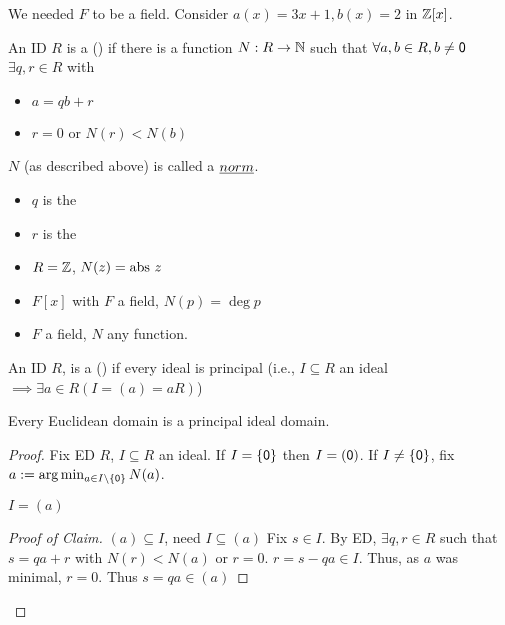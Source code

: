 \documentclass[notes.tex]{subfiles}
\begin{document}
We needed $F$ to be a field. Consider $a(x) = 3x+1, b(x) = 2$ in $\mathbb{Z}[x]$.

\begin{defn}
	An ID $R$ is a  () if there is a function $N:R\to \mathbb{N}$ such that $\forall a, b\in R, b\ne \mathsf{0}$ $\exists q , r\in R $ with
	\begin{itemize}
    \item $a=qb+r$
    \item $r=0$ or $N(r) < N(b)$
  \end{itemize}
\end{defn}

\begin{notation}
	$N$ (as described above) is called a $\kw{norm}$.
	\begin{itemize}
		\item $q$ is the 
		\item $r$ is the 
	\end{itemize}
\end{notation}

\begin{eg}\leavevmode
	\begin{itemize}
		\item $R = \mathbb{Z}$, $N(z) = \mathrm{abs\ } z$
		\item $F[x]$ with $F$ a field, $N(p) = \deg p$
		\item $F$ a field, $N$ any function.
	\end{itemize}
\end{eg}

\begin{defn}
	An ID $R$, is a  () if every ideal is principal (i.e., $I\subseteq R$ an ideal $\implies \exists a\in R (I = (a) = aR)$)
\end{defn}

\begin{proposition}
	Every Euclidean domain is a principal ideal domain.
\end{proposition}
\begin{proof}
	Fix ED $R$, $I\subseteq R$ an ideal. If $I = \{\mathsf{0}\}$ then $I = (\mathsf{0})$. If $I \ne \{\mathsf{0}\}$, fix $a := \arg\min_{a\in I\setminus\{\mathsf{0}\}} N(a)$.
	\begin{claim}
		$I=(a)$
	\end{claim}
	\begin{proof}[Proof of Claim]
		$(a)\subseteq I$, need $I\subseteq (a)$ Fix $s\in I$. By ED, $\exists q, r\in R$ such that $s=qa+r$ with $N(r) < N(a)$ or $r=0$. $r = s-qa\in I$. Thus, as $a$ was minimal, $r=0$. Thus $s=qa \in (a)$
	\end{proof}
\end{proof}
\end{document}
